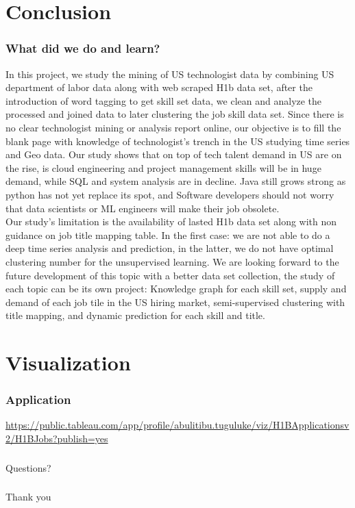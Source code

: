 \documentclass[10pt,mathserif]{beamer}
\begin{document}
\section{Conclusion}
	\begin{frame}
	\frametitle{What did we do and learn?}
	\tiny
In this project, we study the mining of US technologist data by combining US department of labor data along with web scraped H1b data set, after the introduction of word tagging to get skill set data, we clean and analyze the processed and joined data to later clustering the job skill data set. Since there is no clear technologist mining or analysis report online, our objective is to fill the blank page with knowledge of technologist's trench in the US studying  time series and Geo data. Our study shows that on top of tech talent demand in US are on the rise, is cloud engineering and project management skills will be in huge demand, while SQL and system analysis are in decline. Java still grows strong as python has not yet replace its spot, and Software developers should not worry that data scientists or ML engineers will make their job obsolete. \\
Our study's limitation is the availability of  lasted H1b data set along with non guidance on job title mapping table. In the first case: we are not able to do a deep time series analysis and prediction, in the latter, we do not have optimal clustering number for the unsupervised learning. 
We are looking forward to the future development of this topic with a better data set collection, the study of each topic can be its own project: Knowledge graph for each skill set, supply and demand of each job tile in the US hiring market, semi-supervised clustering with title mapping, and dynamic prediction for each skill and title.
	
\end{frame}
\section{Visualization}
	\begin{frame}
	\frametitle{Application}
\url{https://public.tableau.com/app/profile/abulitibu.tuguluke/viz/H1BApplicationsv2/H1BJobs?publish=yes}
\end{frame}


	\begin{frame}
	\frametitle{}
	\centering
	\huge
Questions?
\end{frame}


	\begin{frame}
	\frametitle{}
	\centering
	\huge
Thank you
\end{frame}
\end{document}
